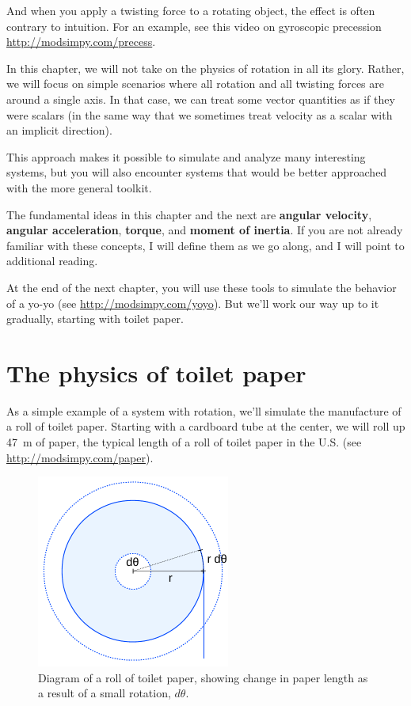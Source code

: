 \documentclass[12pt]{book}
\theoremstyle{exercise}
\begin{document}
And when you apply a twisting force to a rotating object, the effect is often contrary to intuition.  For an example, see this video on gyroscopic precession \url{http://modsimpy.com/precess}.


In this chapter, we will not take on the physics of rotation in all its glory.  Rather, we will focus on simple scenarios where all rotation and all twisting forces are around a single axis.  In that case, we can treat some vector quantities as if they were scalars (in the same way that we sometimes treat velocity as a scalar with an implicit direction).


This approach makes it possible to simulate and analyze many interesting systems, but you will also encounter systems that would be better approached with the more general toolkit.

The fundamental ideas in this chapter and the next are {\bf angular velocity}, {\bf angular acceleration}, {\bf torque}, and {\bf moment of inertia}.  If you are not already familiar with these concepts, I will define them as we go along, and I will point to additional reading.

At the end of the next chapter, you will use these tools to simulate the behavior of a yo-yo (see \url{http://modsimpy.com/yoyo}).  But we'll work our way up to it gradually, starting with toilet paper.



\section{The physics of toilet paper}
\label{paper}

As a simple example of a system with rotation, we'll simulate the manufacture of a roll of toilet paper.  Starting with a cardboard tube at the center, we will roll up \SI{47}{\meter} of paper, the typical length of a roll of toilet paper in the U.S. (see \url{http://modsimpy.com/paper}).


\begin{figure}
\centerline{\includegraphics[height=2.5in]{figs/paper_roll.pdf}}
\caption{Diagram of a roll of toilet paper, showing change in paper length as a result of a small rotation, $d\theta$.}
\label{paper_roll}
\end{figure}
\end{document}
